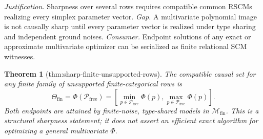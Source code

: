 \documentclass{article}
\newtheorem{theorem}{Theorem}
\begin{document}
\par\smallskip\noindent \textit{Justification.} Sharpness over several rows requires compatible common RSCMs realizing every simplex parameter vector. \textit{Gap.} A multivariate polynomial image is not causally sharp until every parameter vector is realized under type sharing and independent ground noises. \textit{Consumer.} Endpoint solutions of any exact or approximate multivariate optimizer can be serialized as finite relational SCM witnesses.

\begin{theorem}[thm:sharp-finite-unsupported-rows]\label{thm:sharp-finite-unsupported-rows}
The compatible causal set for any finite family of unsupported finite-categorical rows is
\[
 \Theta_{\mathrm{fin}}=\Phi(\mathcal P_{\mathrm{free}})
 =\left[\min_{p\in\mathcal P_{\mathrm{free}}}\Phi(p),
         \max_{p\in\mathcal P_{\mathrm{free}}}\Phi(p)\right].
\]
Both endpoints are attained by finite-noise, type-shared models in \(\mathcal M_{\mathrm{fin}}\).  This is a structural sharpness statement; it does not assert an efficient exact algorithm for optimizing a general multivariate \(\Phi\).
\end{theorem}
\end{document}
